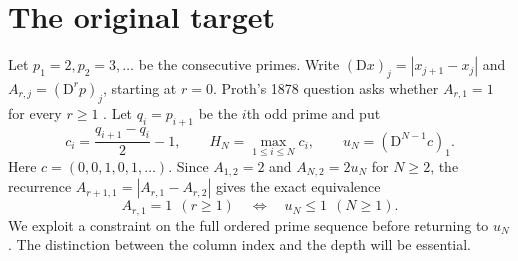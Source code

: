 \documentclass[11pt,a4paper]{article}
\newcommand{\eps}{\varepsilon}
\newcommand{\dd}{\mathrm D}
\begin{document}
\thispagestyle{plain}
\par\medskip
{}\par\smallskip
{}\par\smallskip
{}\par
\begin{abstract}
We ask how closely the running difference between the counts of primes in the two odd residue classes modulo four can follow a line when its slope may be chosen anew for each finite prefix. On the first $N$ odd primes the best maximum error is at least $N^{1/2-\eps}$ for every fixed $\eps>0$ and all sufficiently large $N$. The proof uses opposite prime-power race excursions at two different scales. It gives a lower bound of the same exponent for the least period of each prefix, including a bound allowing symbol changes. In the absolute-difference triangle of normalized prime gaps, a constant-parity block starting in column $j$ at depth $r$ has length $O_\eps((j+r+1)^{2+\eps})$. On column two the residues zero and two modulo four both occur between heights $N^{1/2-\eps}$ and $N$ for every sufficiently large $N$. For the apex of the first $N$ gaps, we exclude the largest two possible values for all sufficiently large $N$, and the largest three when the maximum is divisible by three. The universal bound of one required for the normalized Gilbreath problem remains open.
\end{abstract}
\section{The original target}
Let $p_1=2,p_2=3,\ldots$ be the consecutive primes. Write $(\dd x)_j=|x_{j+1}-x_j|$ and $A_{r,j}=(\dd^r p)_j$, starting at $r=0$. Proth's 1878 question asks whether $A_{r,1}=1$ for every $r\ge1$ \cite{proth,cht}. Let $q_i=p_{i+1}$ be the $i$th odd prime and put
\[
 c_i=\frac{q_{i+1}-q_i}{2}-1,\qquad H_N=\max_{1\le i\le N}c_i,
 \qquad u_N=(\dd^{N-1}c)_1 .
\]
Here $c=(0,0,1,0,1,\ldots)$. Since $A_{1,2}=2$ and $A_{N,2}=2u_N$ for $N\ge2$, the recurrence $A_{r+1,1}=|A_{r,1}-A_{r,2}|$ gives the exact equivalence
\begin{equation}\label{target}
 A_{r,1}=1\ \ (r\ge1)\quad\Longleftrightarrow\quad u_N\le1\ \ (N\ge1).
\end{equation}
We exploit a constraint on the full ordered prime sequence before returning to $u_N$. The distinction between the column index and the depth will be essential.
\newpage
\end{document}
